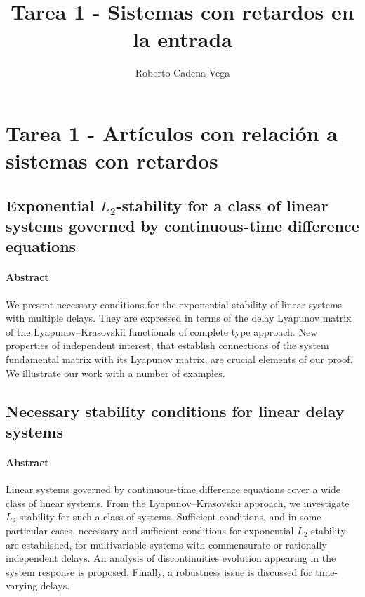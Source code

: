 

\author{Roberto Cadena Vega}
\title{Tarea 1 - Sistemas con retardos en la entrada}


    \maketitle

    \section*{Tarea 1 - Artículos con relación a sistemas con retardos}

        \subsection*{Exponential $L_2$-stability for a class of linear systems governed by continuous-time difference equations\cite{Damak2014}}

            \paragraph{Abstract}

                We present necessary conditions for the exponential stability of linear systems with multiple delays. They are expressed in terms of the delay Lyapunov matrix of the Lyapunov–Krasovskii functionals of complete type approach. New properties of independent interest, that establish connections of the system fundamental matrix with its Lyapunov matrix, are crucial elements of our proof. We illustrate our work with a number of examples.

        \subsection*{Necessary stability conditions for linear delay systems\cite{Egorov2014}}

            \paragraph{Abstract}

                Linear systems governed by continuous-time difference equations cover a wide class of linear systems. From the Lyapunov–Krasovskii approach, we investigate $L_2$-stability for such a class of systems. Sufficient conditions, and in some particular cases, necessary and sufficient conditions for exponential $L_2$-stability are established, for multivariable systems with commensurate or rationally independent delays. An analysis of discontinuities evolution appearing in the system response is proposed. Finally, a robustness issue is discussed for time-varying delays.

